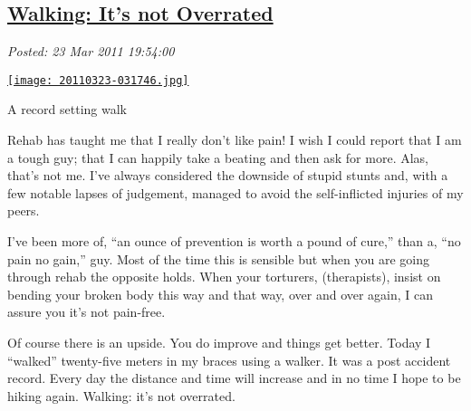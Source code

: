 %

\subsection*{\href{http://bakerjd99.wordpress.com/2011/03/23/walking-its-not-overrated/}{Walking: It's not Overrated}}


\noindent\emph{Posted: 23 Mar 2011 19:54:00}
\vspace{6pt}

\captionsetup[figure]{labelformat=empty}
\begin{floatingfigure}[r]{0.23\textwidth}
\centering
\href{http://conceptcontrol.smugmug.com/Themes/Diaries/SmugShots/16038397_XXJhZx#!i=1241678238&k=74gKFJm&lb=1&s=A}{\texttt{[image: 20110323-031746.jpg]}}
\caption{A record setting walk}
\label{fig:1207X0}
\end{floatingfigure}Rehab has taught me that I really don't like pain! I wish I could report
that I am a tough guy; that I can happily take a beating and then ask
for more. Alas, that's not me. I've always considered the downside of
stupid stunts and, with a few notable lapses of judgement, managed to
avoid the self-inflicted injuries of my peers.

 I've been more of, ``an ounce of prevention is worth a pound of cure,''
than a, ``no pain no gain,'' guy. Most of the time this is sensible but
when you are going through rehab the opposite holds. When your
torturers, (therapists), insist on bending your broken body this way and
that way, over and over again, I can assure you it's not pain-free.

Of course there is an upside. You do improve and things get better.
Today I ``walked'' twenty-five meters in my braces using a walker. It
was a post accident record. Every day the distance and time will
increase and in no time I hope to be hiking again. Walking: it's not
overrated.






%